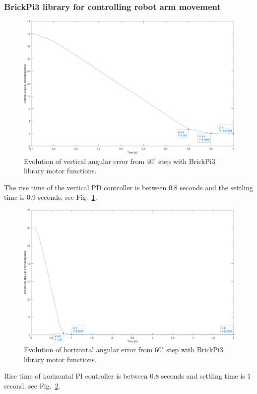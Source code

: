\subsubsection{BrickPi3 library for controlling robot arm movement}
\label{sec:simon16}
\begin{figure}[h]
\centering
\includegraphics[width=\linewidth]{sections/assets/Vertical_built_in_functions.png}
\caption{Evolution of vertical angular error from \(40^{\circ}\) step with BrickPi3 library motor functions.}
\label{vert_bp3}
\end{figure}
The rise time of the vertical PD controller is between 0.8 seconds and the settling time is 0.9 seconds, see Fig.~\ref{vert_bp3}.
\begin{figure}[h]
\centering
\includegraphics[width=\linewidth]{sections/assets/Horizontal_built_in_funtion.png}
\caption{Evolution of horizontal angular error from \(60^{\circ}\) step with BrickPi3 library motor functions.}
\label{Horizontal_bp3}
\end{figure}
Rise time of horizontal PI controller is between 0.8 seconds and settling time is 1 second, see Fig.~\ref{Horizontal_bp3}.

